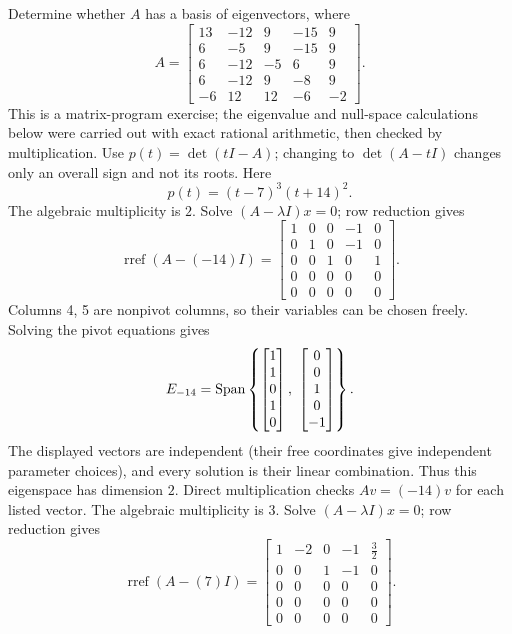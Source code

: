 \goal Determine whether $A$ has a basis of eigenvectors, where
\[A=\begin{bmatrix}13&-12&9&-15&9\\6&-5&9&-15&9\\6&-12&-5&6&9\\6&-12&9&-8&9\\-6&12&12&-6&-2\end{bmatrix}.\]
This is a matrix-program exercise; the eigenvalue and null-space calculations below were carried out with exact rational arithmetic, then checked by multiplication.
Use $p(t)=\det(tI-A)$; changing to $\det(A-tI)$ changes only an overall sign and not its roots. Here
\[p(t)=\left(t - 7\right)^{3} \left(t + 14\right)^{2}.\]
The algebraic multiplicity is $2$. Solve $(A-\lambda I)x=0$; row reduction gives
\[\operatorname{rref}(A-(-14)I)=\begin{bmatrix}1&0&0&-1&0\\0&1&0&-1&0\\0&0&1&0&1\\0&0&0&0&0\\0&0&0&0&0\end{bmatrix}.\]
Columns 4, 5 are nonpivot columns, so their variables can be chosen freely. Solving the pivot equations gives
\[E_{-14}=\Span\left\{\begin{bmatrix}1\\1\\0\\1\\0\end{bmatrix},\ \begin{bmatrix}0\\0\\1\\0\\-1\end{bmatrix}\right\}.\]
The displayed vectors are independent (their free coordinates give independent parameter choices), and every solution is their linear combination. Thus this eigenspace has dimension $2$. Direct multiplication checks $Av=(-14)v$ for each listed vector.
The algebraic multiplicity is $3$. Solve $(A-\lambda I)x=0$; row reduction gives
\[\operatorname{rref}(A-(7)I)=\begin{bmatrix}1&-2&0&-1&\frac{3}{2}\\0&0&1&-1&0\\0&0&0&0&0\\0&0&0&0&0\\0&0&0&0&0\end{bmatrix}.\]
